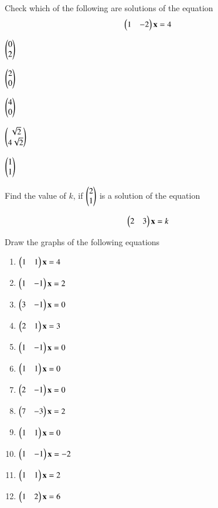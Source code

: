 %
%
\item Check which of the following are solutions of the equation 
%
\begin{align}
\begin{pmatrix}1 & -2\end{pmatrix}\mathbf{x} &= 4
\end{align}
%
%
\begin{enumerate}[itemsep=2pt]
\begin{multicols}{2}
\item $\begin{pmatrix}0 \\ 2\end{pmatrix}$
\item $\begin{pmatrix}2 \\ 0\end{pmatrix}$
\item $\begin{pmatrix}4 \\ 0\end{pmatrix}$
\item $\begin{pmatrix}\sqrt{2} \\ 4\sqrt{2}\end{pmatrix}$
\item $\begin{pmatrix}1 \\ 1\end{pmatrix}$
\end{multicols}
\end{enumerate}
%
\solution

\item Find the value of $k$, if $\begin{pmatrix}2\\1\end{pmatrix}$ is a solution of the equation 
%
\\
\solution

%
\begin{align}
\begin{pmatrix}2 & 3\end{pmatrix}\mathbf{x} &= k
\end{align}
%
%
\item Draw the graphs of the following equations
\begin{enumerate}[itemsep=2pt]
\item $\begin{pmatrix}1 & 1\end{pmatrix}\mathbf{x} = 4$
\item $\begin{pmatrix} 1 & -1\end{pmatrix}\mathbf{x}  = 2 $
\item $\begin{pmatrix} 3 & -1\end{pmatrix}\mathbf{x}  = 0$
\item $\begin{pmatrix} 2 & 1\end{pmatrix}\mathbf{x}  = 3$
\item $\begin{pmatrix} 1 & -1\end{pmatrix}\mathbf{x}  = 0$
\item $\begin{pmatrix} 1& 1\end{pmatrix}\mathbf{x}  = 0$
\item $\begin{pmatrix} 2& -1\end{pmatrix}\mathbf{x}  = 0$
\item $\begin{pmatrix} 7& -3\end{pmatrix}\mathbf{x}  = 2$
\item $\begin{pmatrix} 1& 1\end{pmatrix}\mathbf{x}  = 0$
\item $\begin{pmatrix} 1& -1\end{pmatrix}\mathbf{x}  = -2$
\item $\begin{pmatrix} 1& 1\end{pmatrix}\mathbf{x}  = 2$
\item $\begin{pmatrix} 1& 2\end{pmatrix}\mathbf{x}  = 6$
\end{enumerate}
